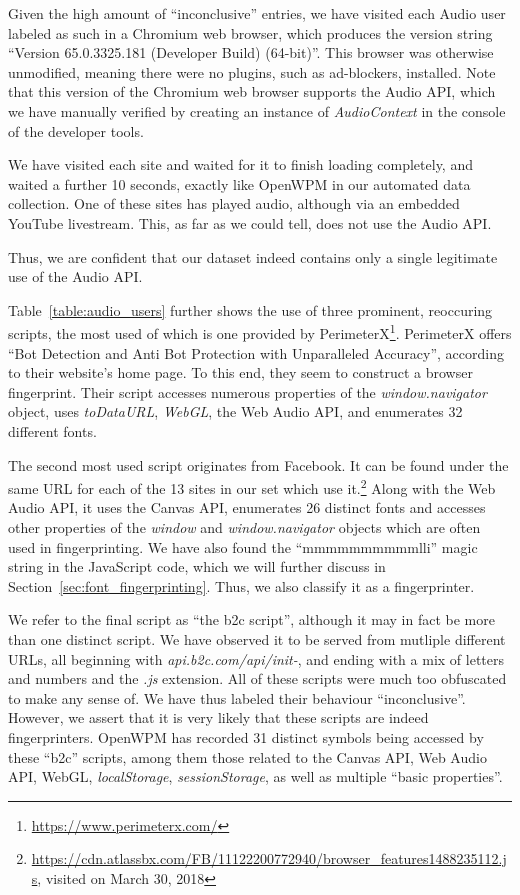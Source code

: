 \documentclass[
    fontsize=12pt,
    headings=small,
    parskip=half,
    bibliography=totoc,
    numbers=noenddot,
    open=any
    ]{scrreprt}
\begin{document}
Given the high amount of ``inconclusive'' entries, we have visited each Audio user labeled as such
in a Chromium web browser, which produces the version string ``Version 65.0.3325.181 (Developer Build) (64-bit)''.
This browser was otherwise unmodified, meaning there were no plugins, such as ad-blockers, installed.
Note that this version of the Chromium web browser supports the Audio API, which we have manually verified
by creating an instance of \textit{AudioContext} in the console of the developer tools.

We have visited each site and waited for it to finish loading completely, and waited a further 10 seconds,
exactly like OpenWPM in our automated data collection.
One of these sites has played audio, although via an embedded YouTube livestream.
This, as far as we could tell, does not use the Audio API.

Thus, we are confident that our dataset indeed contains only a single legitimate use of
the Audio API.

Table~\ref{table:audio_users} further shows the use of three prominent, reoccuring scripts, the most used
of which is one provided by PerimeterX\footnote{\url{https://www.perimeterx.com/}}.
PerimeterX offers ``Bot Detection and Anti Bot Protection with Unparalleled Accuracy'',
according to their website's home page. To this end, they seem to construct a browser fingerprint.
Their script accesses numerous properties of the \textit{window.navigator} object, uses \textit{toDataURL},
\textit{WebGL}, the Web Audio API, and enumerates 32 different fonts.

The second most used script originates from Facebook. It can be found under the same URL
for each of the 13 sites in our set which use it.\footnote{\url{https://cdn.atlassbx.com/FB/11122200772940/browser_features1488235112.js}, visited on March 30, 2018}
Along with the Web Audio API, it uses the Canvas API, enumerates 26 distinct fonts and accesses other
properties of the \textit{window} and \textit{window.navigator} objects which are often used in fingerprinting.
We have also found the ``mmmmmmmmmmlli'' magic string in the JavaScript code, which we will further discuss
in Section~\ref{sec:font_fingerprinting}.
Thus, we also classify it as a fingerprinter.

We refer to the final script as ``the b2c script'', although it may in fact be more than one distinct
script. We have observed it to be served from mutliple different URLs,
all beginning with \textit{api.b2c.com/api/init-}, and ending with a mix of letters and numbers and the \textit{.js} extension.
All of these scripts were much too obfuscated to make any sense of. We have thus labeled their behaviour ``inconclusive''.
However, we assert that it is very likely that these scripts are indeed fingerprinters.
OpenWPM has recorded 31 distinct symbols being accessed by these ``b2c'' scripts, among them
those related to the Canvas API, Web Audio API, WebGL, \textit{localStorage}, \textit{sessionStorage},
as well as multiple ``basic properties''.
\end{document}
